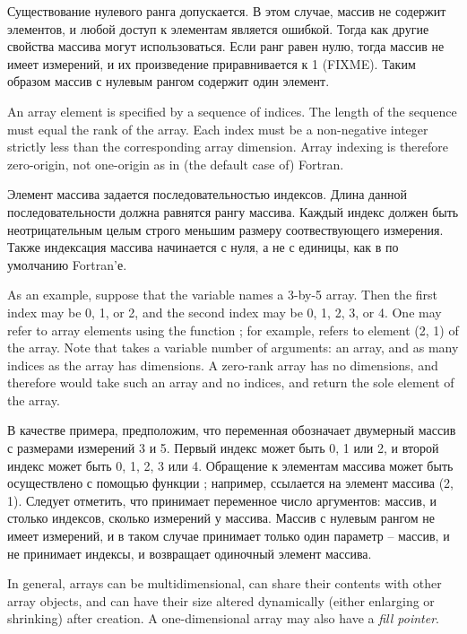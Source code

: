 Существование нулевого ранга допускается. В этом случае, массив не содержит
элементов, и любой доступ к элементам является ошибкой. Тогда как другие
свойства массива могут использоваться. Если ранг равен нулю, тогда массив не
имеет измерений, и их произведение приравнивается к 1 (FIXME).
Таким образом массив с нулевым рангом содержит один элемент.

An array element is specified by a sequence of indices.
The length of the sequence must equal the rank of the array.
Each index must be a non-negative integer strictly less than
the corresponding array dimension.  Array indexing is
therefore zero-origin, not one-origin as in (the default case of)
Fortran.

Элемент массива задается последовательностью индексов.
Длина данной последовательности должна равнятся рангу массива.
Каждый индекс должен быть неотрицательным целым строго меньшим размеру
соотвествующего измерения. Также индексация массива начинается с нуля, а не с
единицы, как в по умолчанию Fortran'е.

As an example, suppose that the variable  names a 3-by-5 array.
Then the first index may be 0, 1, or 2, and the second index
may be 0, 1, 2, 3, or 4.  One may refer to array elements using
the function ; for example, 
refers to element (2, 1) of the array.  Note that  takes
a variable number of arguments: an array, and as many indices
as the array has dimensions.
A zero-rank array has no dimensions, and therefore
 would take such an array and no indices, and return the sole
element of the array.

В качестве примера, предположим, что переменная  обозначает двумерный
массив с размерами измерений 3 и 5. Первый индекс может быть 0, 1 или 2, и второй
индекс может быть 0, 1, 2, 3 или 4. Обращение к элементам массива может быть
осуществлено с помощью функции ; например, 
ссылается на элемент массива (2, 1). Следует отметить, что  принимает
переменное число аргументов: массив, и столько индексов, сколько измерений у
массива.
Массив с нулевым рангом не имеет измерений, и в таком случае  принимает
только один параметр -- массив, и не принимает индексы, и возвращает одиночный
элемент массива.

In general, arrays can be multidimensional,
can share their contents with other array objects, and can have their
size altered dynamically (either enlarging or shrinking) after creation.
A one-dimensional array may also have a {\it fill pointer}.

